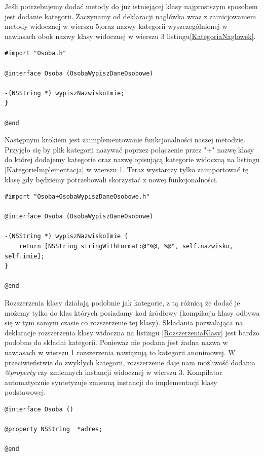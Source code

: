 \documentclass{iiuwb}
\begin{document}
Jeśli potrzebujemy dodać metody do już istniejącej klasy najprostszym sposobem jest dodanie kategorii. Zaczynamy od deklaracji nagłówka wraz z zainicjowaniem metody widocznej w wierszu 5,oraz nazwy kategorii wyszczególnionej w nawiasach obok nazwy klasy widocznej w wierszu 3 listingu\ref{KategoriaNaglowek}.
\begin{lstlisting}[label=KategoriaNaglowek, caption=Deklaracja nowej metody poprzez kategorie]
#import "Osoba.h"

@interface Osoba (OsobaWypiszDaneOsobowe)

-(NSString *) wypiszNazwiskoImie;
}

@end
\end{lstlisting}
Następnym krokiem jest zaimplementowanie funkcjonalności naszej metodzie. Przyjęło się by plik kategorii nazywać poprzez połączenie przez "+" nazwę klasy do której dodajemy kategorie oraz nazwę opisującą kategorie widoczną na listingu \ref{KategorieImplementacja} w wierszu 1. Teraz wystarczy tylko zaimportować tę klasę gdy będziemy potrzebowali skorzystać z nowej funkcjonalności.
\begin{lstlisting}[label=KategorieImplementacja, caption=Definicja metody kategorii]
#import "Osoba+OsobaWypiszDaneOsobowe.h"

@interface Osoba (OsobaWypiszDaneOsobowe)

-(NSString *) wypiszNazwiskoImie {
	return [NSString stringWithFormat:@"%@, %@", self.nazwisko, self.imie];
}

@end
\end{lstlisting}
Rozszerzenia klasy działają podobnie jak kategorie, z tą różnicą że dodać je możemy tylko do klas których posiadamy kod źródłowy (kompilacja klasy odbywa się w tym samym czasie co rozszerzenie tej klasy). Składania pozwalająca na deklaracje rozszerzenia klasy widoczna na listingu \ref{RozszerzeniaKlasy} jest bardzo podobno do składni kategorii. Ponieważ nie podana jest żadna nazwa w nawiasach w wierszu 1 rozszerzenia nawiązują to kategorii anonimowej. W przeciwieństwie do zwykłych kategorii, rozszerzenie daje nam możliwość dodania \textit{@property} czy zmiennych instancji widocznej w wierszu 3. Kompilator automatycznie syntetyzuje zmienną instancji do implementacji klasy podstawowej.

\begin{lstlisting}[label=RozszerzeniaKlasy, caption=Deklaracja nowego parametru poprzez rozszerzenie klasy bazowej]
@interface Osoba ()

@property NSString  *adres; 

@end
\end{lstlisting}
\end{document}
